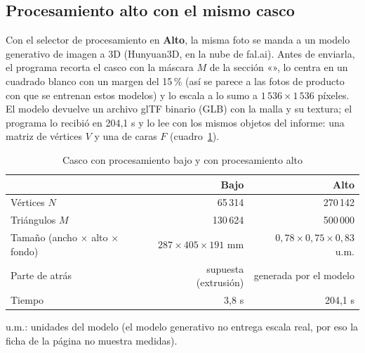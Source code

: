 
\subsection{Procesamiento alto con el mismo casco}\label{sec:alto-matematica}

Con el selector de procesamiento en \textbf{Alto}, la misma foto se manda a un modelo generativo de imagen a 3D (Hunyuan3D, en la nube de fal.ai).
Antes de enviarla, el programa recorta el casco con la máscara $M$ de la sección «», lo centra en un cuadrado blanco
con un margen del 15\,\% (así se parece a las fotos de producto con que se entrenan estos modelos) y lo escala a lo sumo a $1\,536\times1\,536$ píxeles.
El modelo devuelve un archivo glTF binario (GLB) con la malla y su textura; el programa lo recibió en 204{,}1 s y lo lee con los mismos objetos del
informe: una matriz de vértices $V$ y una de caras $F$ (cuadro~\ref{tab:alto}).

\begin{table}[htbp]
\caption{Casco con procesamiento bajo y con procesamiento alto}
\label{tab:alto}
\centering\small
\begin{tabular}{@{}lrr@{}}
\toprule
 & Bajo & Alto \\
\midrule
Vértices $N$ & 65\,314 & 270\,142 \\
Triángulos $M$ & 130\,624 & 500\,000 \\
Tamaño (ancho $\times$ alto $\times$ fondo) & $287 \times 405 \times 191$ mm & $0{,}78 \times 0{,}75 \times 0{,}83$ u.m. \\
Parte de atrás & supuesta (extrusión) & generada por el modelo \\
Tiempo & 3{,}8 s & 204{,}1 s \\
\bottomrule
\end{tabular}
\par\smallskip\footnotesize u.m.: unidades del modelo (el modelo generativo no entrega escala real, por eso la ficha de la página no muestra medidas).
\end{table}

